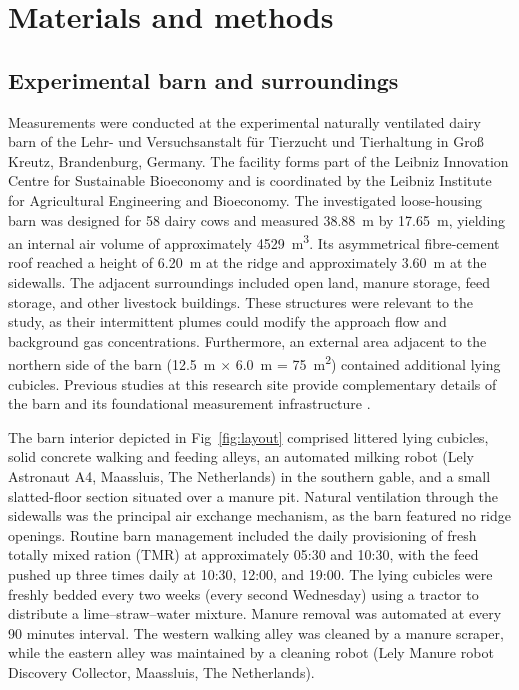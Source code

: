 \documentclass[12pt,a4paper]{article}
\begin{document}
\section{Materials and methods}

\subsection{Experimental barn and surroundings}

Measurements were conducted at the experimental naturally ventilated dairy barn of the Lehr- und Versuchsanstalt f\"ur Tierzucht und Tierhaltung in Gro{\ss} Kreutz, Brandenburg, Germany. The facility forms part of the Leibniz Innovation Centre for Sustainable Bioeconomy and is coordinated by the Leibniz Institute for Agricultural Engineering and Bioeconomy. The investigated loose-housing barn was designed for 58 dairy cows and measured \SI{38.88}{m} by \SI{17.65}{m}, yielding an internal air volume of approximately \SI{4529}{m^3}. Its asymmetrical fibre-cement roof reached a height of \SI{6.20}{m} at the ridge and approximately \SI{3.60}{m} at the sidewalls. The adjacent surroundings included open land, manure storage, feed storage, and other livestock buildings. These structures were relevant to the study, as their intermittent plumes could modify the approach flow and background gas concentrations. Furthermore, an external area adjacent to the northern side of the barn (\SI{12.5}{m} $\times$ \SI{6.0}{m} = \SI{75}{m^2}) contained additional lying cubicles. Previous studies at this research site provide complementary details of the barn and its foundational measurement infrastructure \citep{Hempel2020Methane,Chen2026}.

The barn interior depicted in Fig~\ref{fig:layout} comprised littered lying cubicles, solid concrete walking and feeding alleys, an automated milking robot (Lely Astronaut A4, Maassluis, The Netherlands) in the southern gable, and a small slatted-floor section situated over a manure pit. Natural ventilation through the sidewalls was the principal air exchange mechanism, as the barn featured no ridge openings. Routine barn management included the daily provisioning of fresh totally mixed ration (TMR) at approximately 05:30 and 10:30, with the feed pushed up three times daily at 10:30, 12:00, and 19:00. The lying cubicles were freshly bedded every two weeks (every second Wednesday) using a tractor to distribute a lime–straw–water mixture. Manure removal was automated at every 90 minutes interval. The western walking alley was cleaned by a manure scraper, while the eastern alley was maintained by a cleaning robot (Lely Manure robot Discovery Collector, Maassluis, The Netherlands).
\end{document}
